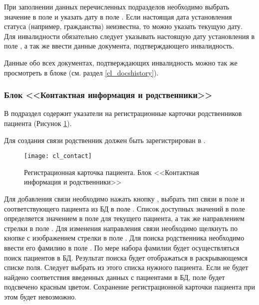 {При заполнении данных перечисленных подразделов необходимо выбрать значение в поле  и указать дату в поле . Если настоящая дата установления статуса (например, гражданства) неизвестна, то можно указать текущую дату. Для инвалидности обязательно следует указывать настоящую дату установления в поле , а так же ввести данные документа, подтверждающего инвалидность.


\begin{prim}
Данные обо всех документах, подтверждающих инвалидность можно так же просмотреть в блоке  (см. раздел \ref{cl_docshistory}).
\end{prim}
 
\subsubsection{Блок <<Контактная информация и родственники>>}

В подраздел  содержит указатели на регистрационные карточки родственников пациента (Рисунок \ref{img_cl_contact}). 

\begin{vnim}
Для создания связи родственник должен быть зарегистрирован в \tmis.
\end{vnim}

\begin{figure}[ht!]\centering
 \texttt{[image: cl\_contact]}
 \caption{Регистрационная карточка пациента. Блок <<Контактная информация и родственники>>}
 \label{img_cl_contact}
\end{figure} 

Для добавления связи необходимо нажать кнопку , выбрать тип связи в поле  и соответствующего пациента из БД в поле . Список доступных значений в поле  определяется значением в поле  для текущего пациента, а так же направлением стрелки в поле . Для изменения направления связи необходимо щелкнуть по кнопке с изображением стрелки в поле . Для поиска родственника необходимо ввести его фамилию в поле . По мере набора фамилии будет осуществляться поиск пациентов в БД. Результат поиска будет отображаться в раскрывающемся списке поля. Следует выбрать из этого списка нужного пациента. Если не будет найдено соответствия введенных данных с пациентами в БД, поле  будет подсвечено красным цветом. Сохранение регистрационной карточки пациента при этом будет невозможно.

}
